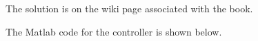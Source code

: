 
The solution is on the wiki page associated with the book.

The Matlab code for the controller is shown below.

%

\ifsolutionmanual




\else




\fi

